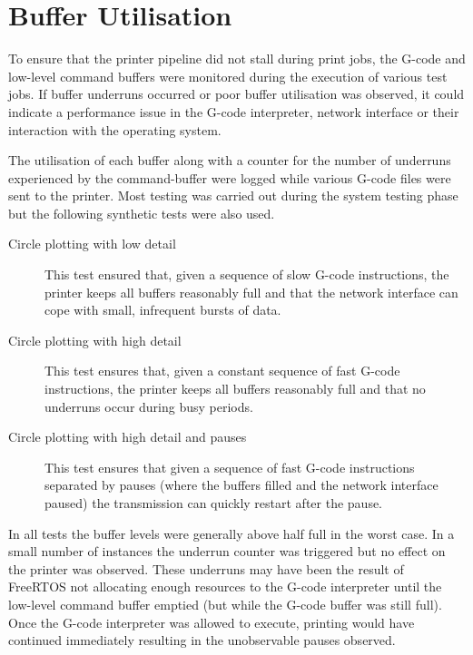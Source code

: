 	\section{Buffer Utilisation}
		
		To ensure that the printer pipeline did not stall during print jobs, the
		G-code and low-level command buffers were monitored during the execution of
		various test jobs. If buffer underruns occurred or poor buffer utilisation
		was observed, it could indicate a performance issue in the G-code
		interpreter, network interface or their interaction with the operating
		system.
		
		The utilisation of each buffer along with a counter for the number of
		underruns experienced by the command-buffer were logged while various G-code
		files were sent to the printer. Most testing was carried out during the
		system testing phase but the following synthetic tests were also used.
		
		\begin{description}
			
			\item[Circle plotting with low detail] This test ensured that, given a
			sequence of slow G-code instructions, the printer keeps all buffers
			reasonably full and that the network interface can cope with small,
			infrequent bursts of data.
			
			\item[Circle plotting with high detail] This test ensures that, given a
			constant sequence of fast G-code instructions, the printer keeps all
			buffers reasonably full and that no underruns occur during busy periods.
			
			\item[Circle plotting with high detail and pauses] This test ensures that
			given a sequence of fast G-code instructions separated by pauses (where
			the buffers filled and the network interface paused) the transmission can
			quickly restart after the pause.
			
		\end{description}
		
		In all tests the buffer levels were generally above half full in the worst
		case. In a small number of instances the underrun counter was triggered but
		no effect on the printer was observed. These underruns may have been the
		result of FreeRTOS not allocating enough resources to the G-code interpreter
		until the low-level command buffer emptied (but while the G-code buffer was
		still full). Once the G-code interpreter was allowed to execute, printing
		would have continued immediately resulting in the unobservable pauses
		observed.
	
